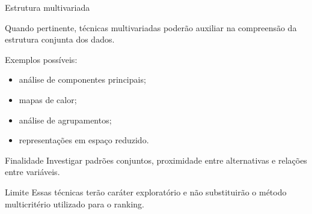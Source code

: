\begin{frame}{Estrutura multivariada}

    Quando pertinente, técnicas multivariadas poderão auxiliar na
    compreensão da estrutura conjunta dos dados.

    \vspace{0.3cm}

    Exemplos possíveis:

    \begin{itemize}
        \item análise de componentes principais;
        \item mapas de calor;
        \item análise de agrupamentos;
        \item representações em espaço reduzido.
    \end{itemize}

    \vspace{0.3cm}

    \begin{block}{Finalidade}
        Investigar padrões conjuntos, proximidade entre alternativas e
        relações entre variáveis.
    \end{block}

    \vspace{0.2cm}

    \begin{alertblock}{Limite}
        Essas técnicas terão caráter exploratório e não substituirão
        o método multicritério utilizado para o ranking.
    \end{alertblock}

\end{frame}



